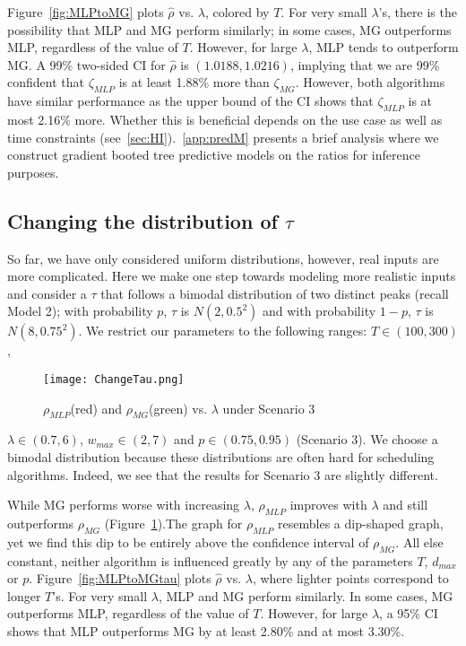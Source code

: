 \documentclass[oribibl]{llncs}
\begin{document}
Figure~\ref{fig:MLPtoMG} plots $\hat{\rho}$ vs. $\lambda$, colored by $T$. For very small $\lambda$'s, there is the
possibility that MLP and MG perform similarly; in some cases, MG
outperforms MLP, regardless of the value of $T$. However, for large
$\lambda$, MLP tends to outperform MG. A 99\% two-sided CI for
$\hat{\rho}$ is $(1.0188, 1.0216)$, implying that we are 99\%
confident that $\zeta_{MLP}$ is at least 1.88\% more
than $\zeta_{MG}$. However, both algorithms have similar performance as the
upper bound of the CI shows that $\zeta_{MLP}$ is at most
2.16\% more. Whether this is beneficial depends on the use case as
well as time constraints (see~\ref{sec:HI}).~\ref{app:predM} presents a brief analysis where we construct
gradient booted tree predictive models on the ratios for inference
purposes. 




\vspace{-14pt}
\subsection{Changing the distribution of $\tau$}

So far, we have only considered uniform distributions, however, real
inputs are more complicated.  Here we make one step towards
modeling more realistic inputs and consider a 
$\tau$ that follows a bimodal distribution of two distinct peaks (recall Model 2); with probability
$p$, $\tau$ is $N(2,0.5^2)$ and with probability $1-p$, $\tau$ is
$N(8, 0.75^2)$. We restrict our parameters to the following ranges: $T
\in (100,300)$, 

\begin{figure}[hb]\centering 
\vspace{-20pt}
\texttt{[image: ChangeTau.png]}
\caption{$\rho_{MLP}$(red) and $\rho_{MG}$(green) vs. $\lambda$ under Scenario 3}
\label{fig:ChangeTau}
\end{figure}
 \noindent
$\lambda \in (0.7,6)$, $w_{max} \in (2,7)$ and $p \in
(0.75,0.95)$ (Scenario 3). 
We choose a bimodal distribution because these distributions are often
hard for scheduling algorithms.  Indeed, we see that the
results for Scenario 3 are slightly
different.

While MG performs worse with increasing $\lambda$, $\rho_{MLP}$
improves with $\lambda$ and still outperforms $\rho_{MG}$
(Figure~\ref{fig:ChangeTau}).The graph for $\rho_{MLP}$ resembles a
dip-shaped graph, yet we find this dip to be entirely above the
confidence interval of $\rho_{MG}$. All else constant, neither
algorithm is influenced greatly by any of the parameters $T$,
$d_{max}$ or $p$.  Figure~\ref{fig:MLPtoMGtau} plots $\hat{\rho}$
vs. $\lambda$, where lighter points correspond to longer $T$'s. For
very small $\lambda$, MLP and MG perform similarly. In some cases, MG
outperforms MLP, regardless of the value of $T$. However, for large
$\lambda$, a 95\% CI shows that MLP outperforms MG by at least 2.80\%
and at most 3.30\%.
\end{document}
